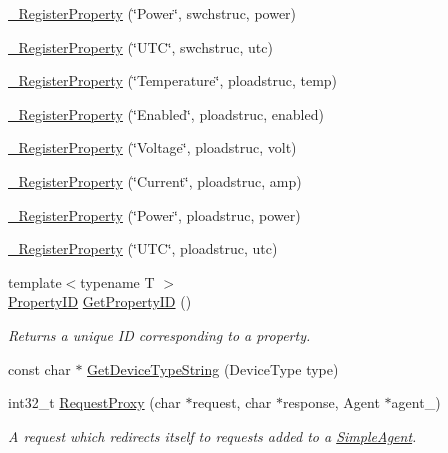 \begin{DoxyCompactItemize}
\item 
\hyperlink{namespacecubesat_a17a0144937747f1e51aee81a234f99ac}{\+\_\+\+Register\+Property} (\char`\"{}Power\char`\"{}, swchstruc, power)
\item 
\hyperlink{namespacecubesat_aaff2b0b308c7ef11aa9b139b5335e801}{\+\_\+\+Register\+Property} (\char`\"{}U\+TC\char`\"{}, swchstruc, utc)
\item 
\hyperlink{namespacecubesat_a6dfe80daa72908aeceb10c75578066a8}{\+\_\+\+Register\+Property} (\char`\"{}Temperature\char`\"{}, ploadstruc, temp)
\item 
\hyperlink{namespacecubesat_a2665beb7cdaf986597d4d7c0324475df}{\+\_\+\+Register\+Property} (\char`\"{}Enabled\char`\"{}, ploadstruc, enabled)
\item 
\hyperlink{namespacecubesat_a764740652bec6157a44361ca932519f3}{\+\_\+\+Register\+Property} (\char`\"{}Voltage\char`\"{}, ploadstruc, volt)
\item 
\hyperlink{namespacecubesat_a096a9ee58ec6fd7245a3d2cbdf4853e2}{\+\_\+\+Register\+Property} (\char`\"{}Current\char`\"{}, ploadstruc, amp)
\item 
\hyperlink{namespacecubesat_adf899b7f005579a222e38a2049d18ecc}{\+\_\+\+Register\+Property} (\char`\"{}Power\char`\"{}, ploadstruc, power)
\item 
\hyperlink{namespacecubesat_a072dc6b35f6341cb0f601f5255458de4}{\+\_\+\+Register\+Property} (\char`\"{}U\+TC\char`\"{}, ploadstruc, utc)
\item 
{\footnotesize template$<$typename T $>$ }\\\hyperlink{namespacecubesat_ab5c769503b8a77bc90a47ca8705f2f86}{Property\+ID} \hyperlink{namespacecubesat_a705e2168749172dcbae8a042595376f9}{Get\+Property\+ID} ()
\begin{DoxyCompactList}\small\item\em Returns a unique ID corresponding to a property. \end{DoxyCompactList}\item 
const char $\ast$ \hyperlink{namespacecubesat_a81f456d1c4c1074ce18ac724303763bc}{Get\+Device\+Type\+String} (Device\+Type type)
\item 
int32\+\_\+t \hyperlink{namespacecubesat_a9779717726c4d78b76d7a3a10556cf7a}{Request\+Proxy} (char $\ast$request, char $\ast$response, Agent $\ast$agent\+\_\+)
\begin{DoxyCompactList}\small\item\em A request which redirects itself to requests added to a \hyperlink{classcubesat_1_1SimpleAgent}{Simple\+Agent}. \end{DoxyCompactList}\item 

\end{DoxyCompactItemize}
